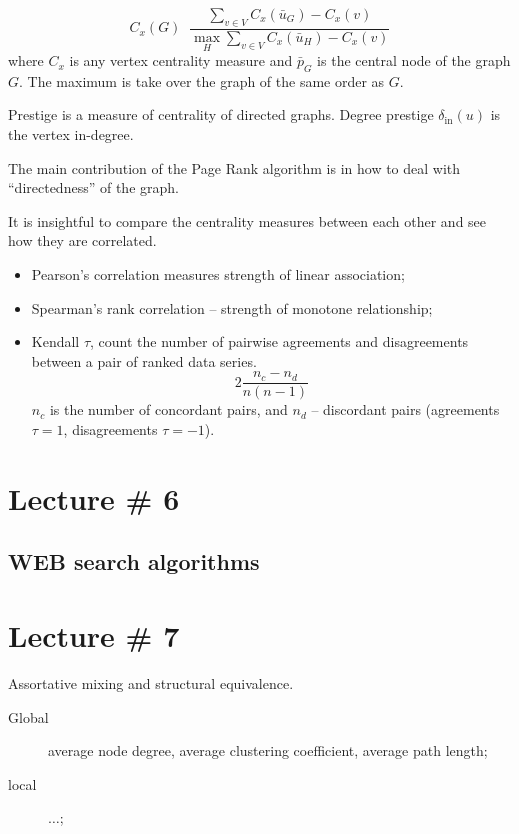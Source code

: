 \documentclass[a4paper]{article}
\newcommand{\defn}{\mathop{\overset{\Delta}{=}}\nolimits}
\begin{document}
\[C_x(G) \defn \frac{\sum_{v\in V} C_x(\bar{u}_G) - C_x(v) }{\max_H \sum_{v\in V} C_x(\bar{u}_H) - C_x(v)}\]
where $C_x$ is any vertex centrality measure and $\bar{p}_G$ is the central node of the graph $G$. The maximum is take over the graph of the same order as $G$.

Prestige is a measure of centrality of directed graphs.
Degree prestige $\delta_{\text{in}}(u)$ is the vertex in-degree.

The main contribution of the Page Rank algorithm is in how to deal with ``directedness'' of the graph.

It is insightful to compare the centrality measures between each other and see how they are correlated.
\begin{itemize}
	\item Pearson's correlation measures strength of linear association;
	\item Spearman's rank correlation -- strength of monotone relationship;
	\item Kendall $\tau$, count the number of pairwise agreements and disagreements between a pair of ranked data series. 
	\[2\frac{n_c - n_d}{n(n-1)}\]
	$n_c$ is the number of concordant pairs, and $n_d$ -- discordant pairs (agreements $\tau=1$, disagreements $\tau=-1$).
\end{itemize}


\section{Lecture \# 6} %
\label{sec:lecture_6}

\subsection{WEB search algorithms} %
\label{sub:web_search_algorithms}





\section{Lecture \# 7} %
\label{sec:lecture_7}

Assortative mixing and structural equivalence.
\begin{description}
	\item[Global] average node degree, average clustering coefficient, average path length;
	\item[local] $\ldots$;
\end{description}
\end{document}
